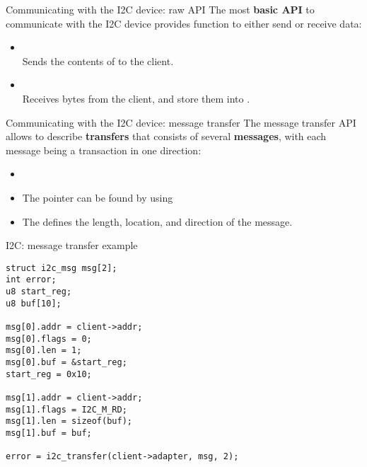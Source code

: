\begin{frame}{Communicating with the I2C device: raw API}
  The most {\bf basic API} to communicate with the I2C device provides
  function to either send or receive data:
  \begin{itemize}
  \item
    \\Sends
    the contents of  to the client.
  \item
    \\Receives
     bytes from the client, and store them into
    .
  \end{itemize}
\end{frame}

\begin{frame}{Communicating with the I2C device: message transfer}
  The message transfer API allows to describe {\bf transfers} that
  consists of several {\bf messages}, with each message being a
  transaction in one direction:
  \begin{itemize}
  \item
  \item The  pointer can be found by using
  \item The  defines the length, location, and
    direction of the message.
  \end{itemize}
\end{frame}

\begin{frame}[fragile]{I2C: message transfer example}
\begin{block}{}
  \begin{verbatim}
struct i2c_msg msg[2];
int error;
u8 start_reg;
u8 buf[10];

msg[0].addr = client->addr;
msg[0].flags = 0;
msg[0].len = 1;
msg[0].buf = &start_reg;
start_reg = 0x10;

msg[1].addr = client->addr;
msg[1].flags = I2C_M_RD;
msg[1].len = sizeof(buf);
msg[1].buf = buf;

error = i2c_transfer(client->adapter, msg, 2);
\end{verbatim}
\end{block}
\end{frame}

